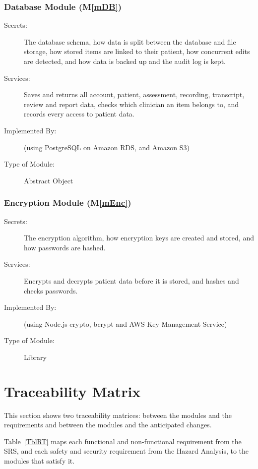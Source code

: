 \documentclass[12pt, titlepage]{article}
\newcommand{\mref}[1]{M\ref{#1}}
\begin{document}
\subsubsection{Database Module (\mref{mDB})}
\begin{description}
\item[Secrets:]The database schema, how data is split between the database and file storage, how stored items are linked to their patient, how concurrent edits are detected, and how data is backed up and the audit log is kept.
\item[Services:]Saves and returns all account, patient, assessment, recording, transcript, review and report data, checks which clinician an item belongs to, and records every access to patient data.
\item[Implemented By:] \progname{} (using PostgreSQL on Amazon RDS, and Amazon S3)
\item[Type of Module:] Abstract Object
\end{description}

\subsubsection{Encryption Module (\mref{mEnc})}
\begin{description}
\item[Secrets:]The encryption algorithm, how encryption keys are created and stored, and how passwords are hashed.
\item[Services:]Encrypts and decrypts patient data before it is stored, and hashes and checks passwords.
\item[Implemented By:] \progname{} (using Node.js crypto, bcrypt and AWS Key Management Service)
\item[Type of Module:] Library
\end{description}



\section{Traceability Matrix} \label{SecTM}

This section shows two traceability matrices: between the modules and the
requirements and between the modules and the anticipated changes.

Table~\ref{TblRT} maps each functional and non-functional requirement from the
SRS, and each safety and security requirement from the Hazard Analysis, to the
modules that satisfy it.
\end{document}
